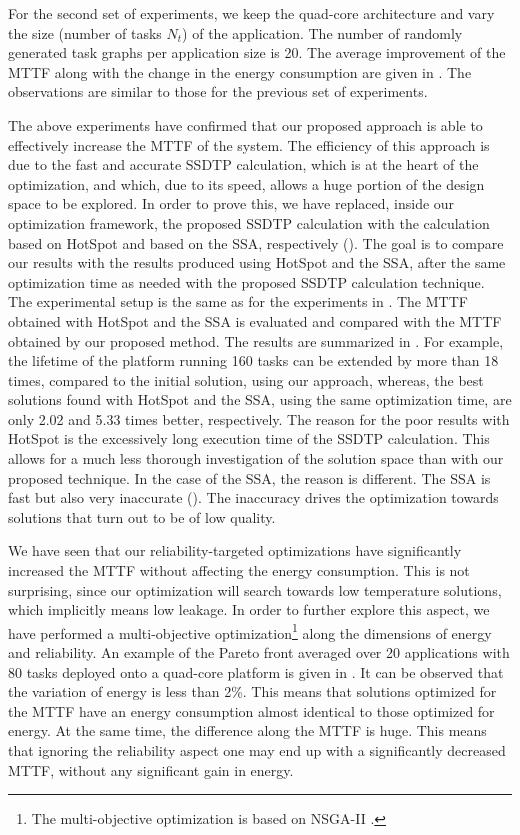 For the second set of experiments, we keep the quad-core architecture and vary
the size (number of tasks $N_t$) of the application. The number of randomly
generated task graphs per application size is 20. The average improvement of the
MTTF along with the change in the energy consumption are given in
. The observations are similar to those for the previous set of
experiments.

The above experiments have confirmed that our proposed approach is able to
effectively increase the MTTF of the system. The efficiency of this approach is
due to the fast and accurate SSDTP calculation, which is at the heart of the
optimization, and which, due to its speed, allows a huge portion of the design
space to be explored. In order to prove this, we have replaced, inside our
optimization framework, the proposed SSDTP calculation with the calculation
based on HotSpot and based on the SSA, respectively
(). The goal is to compare our results with the
results produced using HotSpot and the SSA, after the same optimization time as
needed with the proposed SSDTP calculation technique. The experimental setup is
the same as for the experiments in . The MTTF obtained with
HotSpot and the SSA is evaluated and compared with the MTTF obtained by our
proposed method. The results are summarized in . For
example, the lifetime of the platform running 160 tasks can be extended by more
than 18 times, compared to the initial solution, using our approach, whereas,
the best solutions found with HotSpot and the SSA, using the same optimization
time, are only 2.02 and 5.33 times better, respectively. The reason for the poor
results with HotSpot is the excessively long execution time of the SSDTP
calculation. This allows for a much less thorough investigation of the solution
space than with our proposed technique. In the case of the SSA, the reason is
different. The SSA is fast but also very inaccurate
(). The inaccuracy drives the optimization
towards solutions that turn out to be of low quality.

We have seen that our reliability-targeted optimizations have significantly
increased the MTTF without affecting the energy consumption. This is not
surprising, since our optimization will search towards low temperature
solutions, which implicitly means low leakage. In order to further explore this
aspect, we have performed a multi-objective optimization\footnote{The
multi-objective optimization is based on NSGA-II \cite{deb2002}.} along the
dimensions of energy and reliability. An example of the Pareto front averaged
over 20 applications with 80 tasks deployed onto a quad-core platform is given
in . It can be observed that the variation of energy
is less than 2\%. This means that solutions optimized for the MTTF have an
energy consumption almost identical to those optimized for energy. At the same
time, the difference along the MTTF is huge. This means that ignoring the
reliability aspect one may end up with a significantly decreased MTTF, without
any significant gain in energy.

